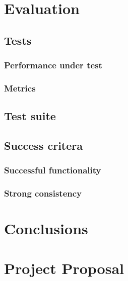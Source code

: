\documentclass[12pt,a4paper,twoside,openright]{report}
\begin{document}
\chapter{Evaluation}

\section{Tests}

\subsection{Performance under test}

\subsection{Metrics}

\section{Test suite}

\section{Success critera}

\subsection{Successful functionality}

\subsection{Strong consistency}

\chapter{Conclusions}



\appendix

\chapter{Project Proposal}


\end{document}

